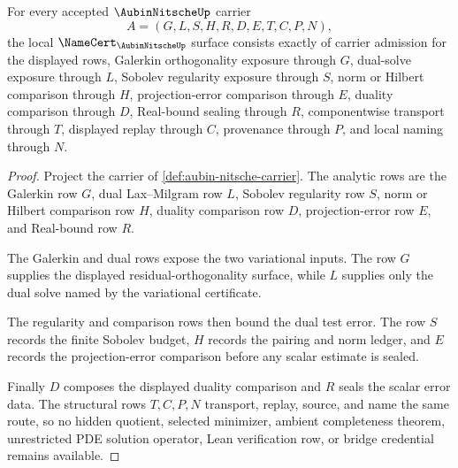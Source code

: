 \begin{theorem}
\label{thm:aubin-nitsche-namecert-obligations}
For every accepted $\AubinNitscheUp$ carrier
$$
A=(G,L,S,H,R,D,E,T,C,P,N),
$$
the local $\NameCert_{\AubinNitscheUp}$ surface consists exactly of carrier admission for the displayed rows, Galerkin orthogonality exposure through $G$, dual-solve exposure through $L$, Sobolev regularity exposure through $S$, norm or Hilbert comparison through $H$, projection-error comparison through $E$, duality comparison through $D$, Real-bound sealing through $R$, componentwise transport through $T$, displayed replay through $C$, provenance through $P$, and local naming through $N$.
\end{theorem}
\begin{proof}
Project the carrier of \autoref{def:aubin-nitsche-carrier}. The analytic rows are the Galerkin row $G$, dual Lax--Milgram row $L$, Sobolev regularity row $S$, norm or Hilbert comparison row $H$, duality comparison row $D$, projection-error row $E$, and Real-bound row $R$.

The Galerkin and dual rows expose the two variational inputs. The row $G$ supplies the displayed residual-orthogonality surface, while $L$ supplies only the dual solve named by the variational certificate.

The regularity and comparison rows then bound the dual test error. The row $S$ records the finite Sobolev budget, $H$ records the pairing and norm ledger, and $E$ records the projection-error comparison before any scalar estimate is sealed.

Finally $D$ composes the displayed duality comparison and $R$ seals the scalar error data. The structural rows $T,C,P,N$ transport, replay, source, and name the same route, so no hidden quotient, selected minimizer, ambient completeness theorem, unrestricted PDE solution operator, Lean verification row, or bridge credential remains available.
\end{proof}

